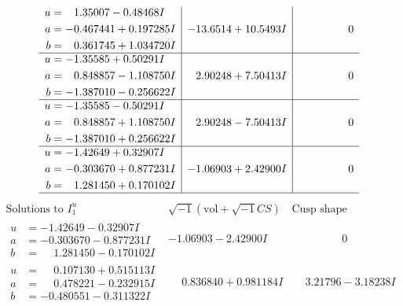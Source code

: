 \documentclass[1p]{elsarticle_modified}
\theoremstyle{definition}
\newcommand{\I}{\sqrt{-1}}
\begin{document}
$$\begin{array}{c|c|c}
\begin{aligned}
u &= \phantom{-}1.35007 - 0.48468 I \\
a &= -0.467441 + 0.197285 I \\
b &= \phantom{-}0.361745 + 1.034720 I\end{aligned}
 & -13.6514 + 10.5493 I & \phantom{-0.000000 } 0 \\ \hline\begin{aligned}
u &= -1.35585 + 0.50291 I \\
a &= \phantom{-}0.848857 - 1.108750 I \\
b &= -1.387010 - 0.256622 I\end{aligned}
 & \phantom{-}2.90248 + 7.50413 I & \phantom{-0.000000 } 0 \\ \hline\begin{aligned}
u &= -1.35585 - 0.50291 I \\
a &= \phantom{-}0.848857 + 1.108750 I \\
b &= -1.387010 + 0.256622 I\end{aligned}
 & \phantom{-}2.90248 - 7.50413 I & \phantom{-0.000000 } 0 \\ \hline\begin{aligned}
u &= -1.42649 + 0.32907 I \\
a &= -0.303670 + 0.877231 I \\
b &= \phantom{-}1.281450 + 0.170102 I\end{aligned}
 & -1.06903 + 2.42900 I & \phantom{-0.000000 } 0\\
 \hline 
 \end{array}$$\newpage$$\begin{array}{c|c|c}  
\text{Solutions to }I^u_{1}& \I (\text{vol} + \sqrt{-1}CS) & \text{Cusp shape}\\
 \hline 
\begin{aligned}
u &= -1.42649 - 0.32907 I \\
a &= -0.303670 - 0.877231 I \\
b &= \phantom{-}1.281450 - 0.170102 I\end{aligned}
 & -1.06903 - 2.42900 I & \phantom{-0.000000 } 0 \\ \hline\begin{aligned}
u &= \phantom{-}0.107130 + 0.515113 I \\
a &= \phantom{-}0.478221 - 0.232915 I \\
b &= -0.480551 - 0.311322 I\end{aligned}
 & \phantom{-}0.836840 + 0.981184 I & \phantom{-}3.21796 - 3.18238 I \\ \hline\begin{aligned}

\end{aligned}
\end{array}$$
\end{document}
